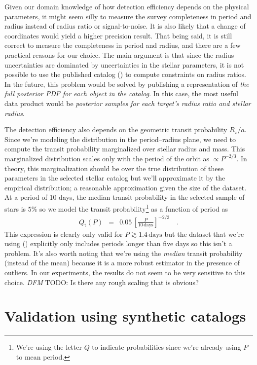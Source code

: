 \documentclass[12pt,preprint]{aastex}
\newcommand{\todo}[3]{{\color{#2} \emph{#1} TODO: #3}}
\newcommand{\dfmtodo}[1]{\todo{DFM}{red}{#1}}
\newcommand{\period}{\ensuremath{P}}
\newcommand{\transitprob}{{\ensuremath{Q_\mathrm{t}}}}
\begin{document}
Given our domain knowledge of how detection efficiency depends on the physical
parameters, it might seem silly to measure the survey completeness in period
and radius instead of radius ratio or signal-to-noise.
It is also likely that a change of coordinates would yield a higher precision
result.
That being said, it is still correct to measure the completeness in period and
radius, and there are a few practical reasons for our choice.
The main argument is that since the radius uncertainties are dominated by
uncertainties in the stellar parameters, it is not possible to use the
published catalog (\citealt{petigura}) to compute constraints on radius
ratios.
In the future, this problem would be solved by publishing a representation of
\emph{the full posterior PDF for each object in the catalog}.
In this case, the most useful data product would be \emph{posterior samples
for each target's radius ratio and stellar radius}.

The detection efficiency also depends on the geometric transit probability
$R_\star/a$.
Since we're modeling the distribution in the period--radius plane, we need to
compute the transit probability marginalized over stellar radius and mass.
This marginalized distribution scales only with the period of the orbit as
$\propto \period^{-2/3}$.
In theory, this marginalization should be over the true distribution of these
parameters in the selected stellar catalog but we'll approximate it by
the empirical distribution; a reasonable approximation given the size of the
dataset.
At a period of 10 days, the median transit probability in the selected sample
of stars is $5\%$ so we model the transit probability\footnote{We're using the
letter $Q$ to indicate probabilities since we're already using $P$ to mean
period.} as a function of period as
\begin{eqnarray}
\transitprob (\period) &=&
    0.05\,\left[\frac{\period}{10\,\mathrm{days}}\right]^{-2/3} \quad.
\end{eqnarray}
This expression is clearly only valid for $\period \gtrsim 1.4\,\mathrm{days}$
but the dataset that we're using (\citealt{petigura}) explicitly only includes
periods longer than five days so this isn't a problem.
It's also worth noting that we're using the \emph{median} transit probability
(instead of the mean) because it is a more robust estimator in the presence of
outliers.
In our experiments, the results do not seem to be very sensitive to this
choice.
\dfmtodo{Is there any rough scaling that is obvious?}

\section{Validation using synthetic catalogs}
\end{document}
